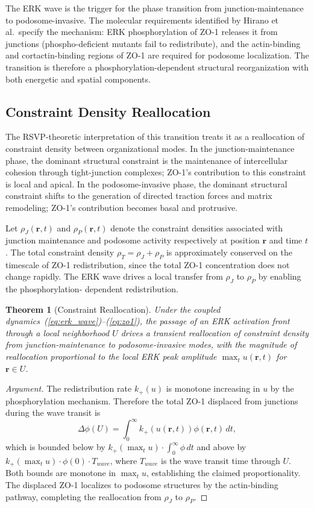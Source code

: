 \documentclass[11pt,a4paper]{article}
\theoremstyle{plain}
\newtheorem{theorem}{Theorem}[section]
\theoremstyle{definition}
\begin{document}
The ERK wave is the trigger for the phase transition from junction-maintenance to
podosome-invasive. The molecular requirements identified by Hirano et al.\ specify the
mechanism: ERK phosphorylation of ZO-1 releases it from junctions (phospho-deficient
mutants fail to redistribute), and the actin-binding and cortactin-binding regions of
ZO-1 are required for podosome localization. The transition is therefore a
phosphorylation-dependent structural reorganization with both energetic and spatial
components.

\subsection{Constraint Density Reallocation}

The RSVP-theoretic interpretation of this transition treats it as a reallocation of
constraint density between organizational modes. In the junction-maintenance phase,
the dominant structural constraint is the maintenance of intercellular cohesion through
tight-junction complexes; ZO-1's contribution to this constraint is local and apical.
In the podosome-invasive phase, the dominant structural constraint shifts to the
generation of directed traction forces and matrix remodeling; ZO-1's contribution
becomes basal and protrusive.

Let $\rho_J(\mathbf{r}, t)$ and $\rho_P(\mathbf{r}, t)$ denote the constraint densities
associated with junction maintenance and podosome activity respectively at position
$\mathbf{r}$ and time $t$. The total constraint density
$\rho_T = \rho_J + \rho_P$ is approximately conserved on the timescale of ZO-1
redistribution, since the total ZO-1 concentration does not change rapidly. The ERK
wave drives a local transfer from $\rho_J$ to $\rho_P$ by enabling the phosphorylation-
dependent redistribution.

\begin{theorem}[Constraint Reallocation]
Under the coupled dynamics~(\ref{eq:erk_wave})--(\ref{eq:zo1}), the passage of an ERK
activation front through a local neighborhood $U$ drives a transient reallocation of
constraint density from junction-maintenance to podosome-invasive modes, with the
magnitude of reallocation proportional to the local ERK peak amplitude $\max_t u(\mathbf{r}, t)$
for $\mathbf{r} \in U$.
\end{theorem}

\begin{proof}[Argument]
The redistribution rate $k_+(u)$ is monotone increasing in $u$ by the phosphorylation
mechanism. Therefore the total ZO-1 displaced from junctions during the wave transit
is
\[
\Delta\phi(U) = \int_0^\infty k_+(u(\mathbf{r}, t)) \phi(\mathbf{r}, t) \, dt,
\]
which is bounded below by $k_+(\max_t u) \cdot \int_0^\infty \phi \, dt$ and above by
$k_+(\max_t u) \cdot \phi(0) \cdot T_{wave}$, where $T_{wave}$ is the wave transit time
through $U$. Both bounds are monotone in $\max_t u$, establishing the claimed proportionality.
The displaced ZO-1 localizes to podosome structures by the actin-binding pathway,
completing the reallocation from $\rho_J$ to $\rho_P$.
\end{proof}
\end{document}
